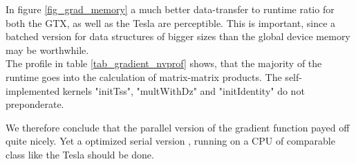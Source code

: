 In figure \ref{fig_grad_memory} a much better data-transfer to runtime ratio for both the GTX, as well as the Tesla are perceptible. This is important, since a batched version for data structures of bigger sizes than the global device memory may be worthwhile. \\

The profile in table  \ref{tab_gradient_nvprof} shows, that the majority of the runtime goes into the calculation of matrix-matrix products. The self-implemented kernels "initTss", "multWithDz" and "initIdentity" do not preponderate.

We therefore conclude that the parallel version of the gradient function payed off quite nicely. Yet a optimized serial version , running on a CPU of comparable class like the Tesla should be done. 